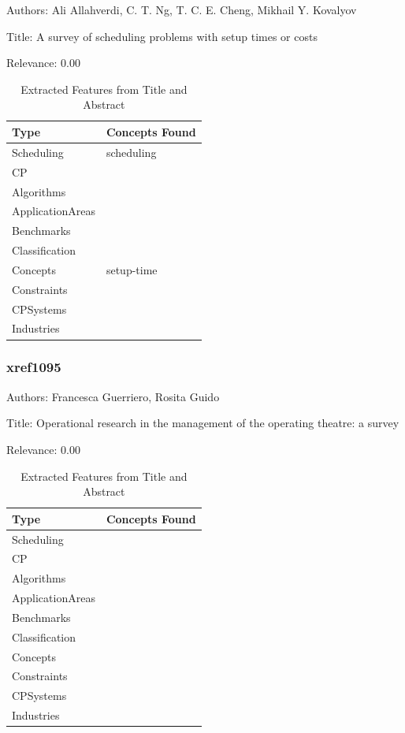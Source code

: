 Authors: Ali Allahverdi, C. T. Ng, T. C. E. Cheng, Mikhail Y. Kovalyov

Title: A survey of scheduling problems with setup times or costs

Relevance:  0.00

{\scriptsize
\begin{longtable}{p{2cm}p{20cm}}
\caption{Extracted Features from Title and Abstract}\\ \toprule
Type & Concepts Found\\ \midrule
\endhead
\bottomrule
\endfoot
Scheduling & scheduling\\ 
CP & \\ 
Algorithms & \\ 
ApplicationAreas & \\ 
Benchmarks & \\ 
Classification & \\ 
Concepts & setup-time\\ 
Constraints & \\ 
CPSystems & \\ 
Industries & \\ 
\end{longtable}
}



\subsubsection{xref1095}
\label{mw:xref1095}

Authors: Francesca Guerriero, Rosita Guido

Title: Operational research in the management of the operating theatre: a survey

Relevance:  0.00

{\scriptsize
\begin{longtable}{p{2cm}p{20cm}}
\caption{Extracted Features from Title and Abstract}\\ \toprule
Type & Concepts Found\\ \midrule
\endhead
\bottomrule
\endfoot
Scheduling & \\ 
CP & \\ 
Algorithms & \\ 
ApplicationAreas & \\ 
Benchmarks & \\ 
Classification & \\ 
Concepts & \\ 
Constraints & \\ 
CPSystems & \\ 
Industries & \\ 
\end{longtable}
}



